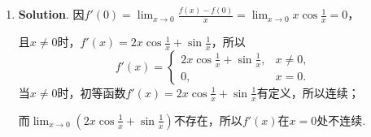 \documentclass[../main.tex]{subfiles}
\begin{document}
\begin{enumerate}
    \item \textbf{Solution}. 因$f'(0)=\lim_{x\to0}\frac{f(x)-f(0)}{x}=\lim_{x\to0}
              x\cos\frac{1}{x}=0$，

          且$x\neq0$时，$f'(x)=2x\cos\frac{1}{x}+\sin\frac{1}{x}$，所以
          \[
              f'(x)=
              \begin{cases}
                  2x\cos\frac{1}{x}+\sin\frac{1}{x}, & x\neq 0, \\
                  0,                                 & x=0.
              \end{cases}
          \]
          当$x\neq0$时，初等函数$f'(x)=2x\cos\frac{1}{x}+\sin\frac{1}{x}$有定义，所以连续；

          而$\lim_{x\to0}\left(2x\cos\frac{1}{x}+\sin\frac{1}{x}\right)$不存在，所以$f
              '(x)$在$x=0$处不连续.
\end{enumerate}
\end{document}
